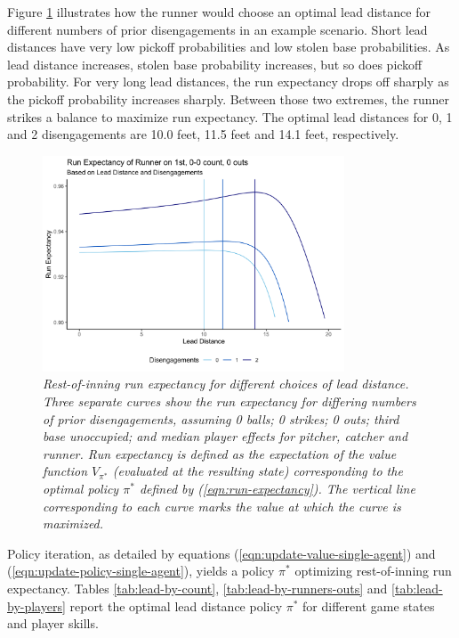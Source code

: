 \documentclass{article}
\begin{document}
      Figure \ref{fig:finding-optimal-lead} illustrates how the runner would choose an optimal lead distance for different numbers of prior disengagements in an example scenario. Short lead distances have very low pickoff probabilities and low stolen base probabilities. As lead distance increases, stolen base probability increases, but so does pickoff probability. For very long lead distances, the run expectancy drops off sharply as the pickoff probability increases sharply. Between those two extremes, the runner strikes a balance to maximize run expectancy. The optimal lead distances for 0, 1 and 2 disengagements are 10.0 feet, 11.5 feet and 14.1 feet, respectively.
      
      \begin{figure}
        \centering
        \includegraphics[width = 0.8\textwidth]{figures/finding_optimal_lead.png}
        \caption{
          \it Rest-of-inning run expectancy for different choices of lead distance. Three separate curves show the run expectancy for differing numbers of prior disengagements, assuming 0 balls; 0 strikes; 0 outs; third base unoccupied; and median player effects for pitcher, catcher and runner. Run expectancy is defined as the expectation of the value function $V_{\pi^*}$ (evaluated at the resulting state) corresponding to the optimal policy $\pi^*$ defined by (\ref{eqn:run-expectancy}). The vertical line corresponding to each curve marks the value at which the curve is maximized.
        }
        \label{fig:finding-optimal-lead}
      \end{figure}

      Policy iteration, as detailed by equations (\ref{eqn:update-value-single-agent}) and (\ref{eqn:update-policy-single-agent}), yields a policy $\pi^*$ optimizing rest-of-inning run expectancy. Tables \ref{tab:lead-by-count}, \ref{tab:lead-by-runners-outs} and \ref{tab:lead-by-players} report the optimal lead distance policy $\pi^*$ for different game states and player skills.
    
\end{document}
